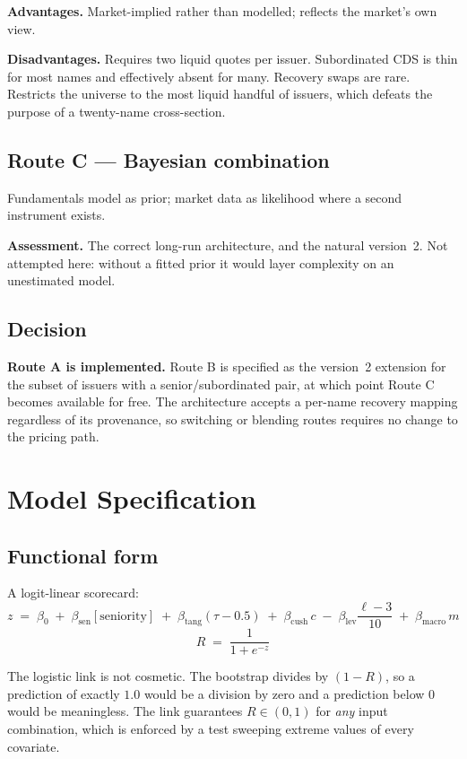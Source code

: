 \documentclass[11pt,a4paper]{article}
\newcommand{\keypoint}[1]{\par\vspace{0.4em}\noindent
  \colorbox{codebg}{\parbox{\dimexpr\linewidth-2\fboxsep}{\small #1}}\par\vspace{0.5em}}
\begin{document}
\textbf{Advantages.} Market-implied rather than modelled; reflects the market's own view.

\textbf{Disadvantages.} Requires two liquid quotes per issuer. Subordinated CDS is thin
for most names and effectively absent for many. Recovery swaps are rare. Restricts the
universe to the most liquid handful of issuers, which defeats the purpose of a
twenty-name cross-section.

\subsection{Route C --- Bayesian combination}

Fundamentals model as prior; market data as likelihood where a second instrument exists.

\textbf{Assessment.} The correct long-run architecture, and the natural version~2. Not
attempted here: without a fitted prior it would layer complexity on an unestimated model.

\subsection{Decision}

\keypoint{\textbf{Route A is implemented.} Route B is specified as the version~2
extension for the subset of issuers with a senior/subordinated pair, at which point
Route C becomes available for free. The architecture accepts a per-name recovery
mapping regardless of its provenance, so switching or blending routes requires no
change to the pricing path.}

\section{Model Specification}

\subsection{Functional form}

A logit-linear scorecard:
\[
z \;=\; \beta_0 \;+\; \beta_{\text{sen}}[\text{seniority}]
\;+\; \beta_{\text{tang}}(\tau - 0.5)
\;+\; \beta_{\text{cush}}\,c
\;-\; \beta_{\text{lev}}\frac{\ell - 3}{10}
\;+\; \beta_{\text{macro}}\,m
\]
\[
R \;=\; \frac{1}{1 + e^{-z}}
\]

The logistic link is not cosmetic. The bootstrap divides by $(1-R)$, so a prediction of
exactly $1.0$ would be a division by zero and a prediction below $0$ would be
meaningless. The link guarantees $R \in (0,1)$ for \emph{any} input combination, which
is enforced by a test sweeping extreme values of every covariate.
\end{document}
